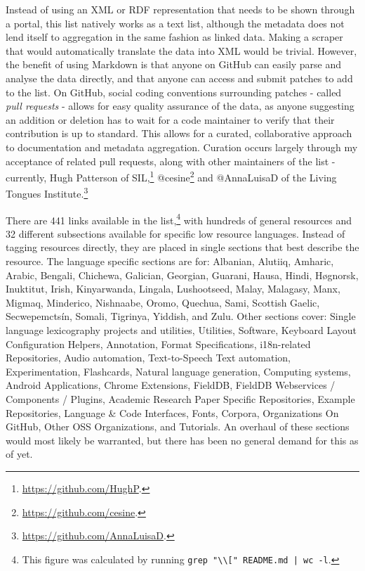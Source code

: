 Instead of using an XML or RDF representation that needs to be shown through a portal, this list natively works as a text list, although the metadata does not lend itself to aggregation in the same fashion as linked data. Making a scraper that would automatically translate the data into XML would be trivial. However, the benefit of using Markdown is that anyone on GitHub can easily parse and analyse the data directly, and that anyone can access and submit patches to add to the list. On GitHub, social coding conventions surrounding patches - called {\it pull requests} - allows for easy quality assurance of the data, as anyone suggesting an addition or deletion has to wait for a code maintainer to verify that their contribution is up to standard. This allows for a curated, collaborative approach to documentation and metadata aggregation. Curation occurs largely through my acceptance of related pull requests, along with other maintainers of the list - currently, Hugh Patterson of SIL,\footnote{\href{https://github.com/HughP}{https://github.com/HughP}. } @cesine\footnote{\href{https://github.com/cesine}{https://github.com/cesine}. } and @AnnaLuisaD of the Living Tongues Institute.\footnote{\href{https://github.com/AnnaLuisaD}{https://github.com/AnnaLuisaD}. }

There are 441 links available in the list,\footnote{This figure was calculated by running \texttt{grep "\textbackslash* \textbackslash[" README.md | wc -l}.} with hundreds of general resources and 32 different subsections available for specific low resource languages. Instead of tagging resources directly, they are placed in single sections that best describe the resource. The language specific sections are for: Albanian, Alutiiq, Amharic, Arabic, Bengali, Chichewa, Galician, Georgian, Guarani, Hausa, Hindi, H\o gnorsk, Inuktitut, Irish, Kinyarwanda, Lingala, Lushootseed, Malay, Malagasy, Manx, Migmaq, Minderico, Nishnaabe, Oromo, Quechua, Sami, Scottish Gaelic, Secwepemcts\'in, Somali, Tigrinya, Yiddish, and Zulu. Other sections cover: Single language lexicography projects and utilities, Utilities, Software, Keyboard Layout Configuration Helpers, Annotation, Format Specifications, i18n-related Repositories, Audio automation, Text-to-Speech
Text automation, Experimentation, Flashcards, Natural language generation, Computing systems, Android Applications, Chrome Extensions, FieldDB, FieldDB Webservices / Components / Plugins, Academic Research Paper Specific Repositories, Example Repositories, Language \& Code Interfaces, Fonts, Corpora, Organizations On GitHub, Other OSS Organizations, and Tutorials. An overhaul of these sections would most likely be warranted, but there has been no general demand for this as of yet.

